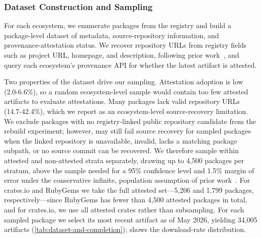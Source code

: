 
\subsubsection{Dataset Construction and Sampling}
\label{subsubsec:setup-artifact-selection}
For each ecosystem, we enumerate packages from the registry and build a package-level dataset of metadata, source-repository information, and provenance-attestation status. We recover repository URLs from registry fields such as project URL, homepage, and description, following prior
work~\cite{gao_pyradar_2024}, and query each ecosystem's provenance API for whether the latest artifact is attested.

Two properties of the dataset drive our sampling. Attestation adoption is low (2.0-6.6\%), so a random ecosystem-level sample would contain too few attested artifacts to evaluate attestations. Many packages lack valid repository URLs (14.7-42.4\%), which we report as an ecosystem-level source-recovery limitation. We exclude packages with no registry-linked public repository candidate from the rebuild experiment; however, \toolname may still fail source recovery for sampled packages when the linked repository is unavailable, invalid, lacks a matching package subpath, or no source commit can be recovered. We therefore sample within attested and non-attested strata separately, drawing up to 4,500 packages per stratum, above the sample needed for a 95\% confidence level and 1.5\% margin of error under the conservative infinite, population assumption of prior work~\cite{benedetti_empirical_2025}. For crates.io and RubyGems we take the full attested set---5{,}206 and 1{,}799 packages, respectively---since RubyGems has fewer than 4{,}500 attested packages in total, and for crates.io, we use all attested crates rather than subsampling. For each sampled package we select its most recent artifact as of May 2026, yielding 34{,}005 artifacts (\cref{tab:dataset-and-completion});  shows the
download-rate distribution.


